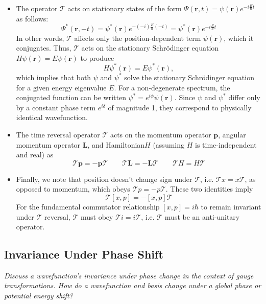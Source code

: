 \documentclass[11pt, a4paper]{article}
\newcommand{\Schro}{Schr\"{o}dinger\xspace}
\newcommand{\Ham}{Hamiltonian\xspace}
\renewcommand{\vec}[1]{\bm{#1}}  %
\renewcommand{\r}{\vec{r}}  %
\newcommand{\T}{\mathcal{T}}  %
\newcommand{\p}{\psi}  %
\renewcommand{\P}{\Psi}  %
\begin{document}
\begin{itemize}
	\item The operator $ \T $ acts on stationary states of the form $ \P(\r, t) = \p(\r)e^{-i\frac{E}{\hbar}t} $ as follows:
	\begin{equation*}
		\P^{*}(\r, -t) = \p^{*}(\r)e^{-(-i)\frac{E}{\hbar}(-t)} = \p^{*}(\r)e^{-i\frac{E}{\hbar}t}
	\end{equation*}
	In other words, $ \T $ affects only the position-dependent term $ \p(\r) $, which it conjugates. Thus, $ \T $ acts on the stationary \Schro equation $ H \p(\r) = E\p(\r) $ to produce
	\begin{equation*}
		 H \p^{*}(\r) = E\p^{*}(\r),
	\end{equation*}
	which implies that both $ \p $ and $ \p^{*} $ solve the stationary \Schro equation for a given energy eigenvalue $ E $. For a non-degenerate spectrum, the conjugated function can be written $ \p^{*} = e^{i\phi}\p(\r) $. Since $ \p $ and $ \p^{*} $ differ only by a constant phase term $ e^{i\delta} $ of magnitude 1, they correspond to physically identical wavefunction.
	
	\item The time reversal operator $ \T $ acts on the momentum operator $ \vec{p} $, angular momentum operator $ \vec{L} $, and \Ham $ H $ (assuming $ H $ is time-independent and real) as
	\begin{equation*}
		\T \vec{p} = - \vec{p} \T \qquad \T \vec{L} = - \vec{L} \T \qquad \T H = H \T
	\end{equation*}
	
	\item Finally, we note that position doesn't change sign under $ \T $, i.e. $ \T x = x \T $, as opposed to momentum, which obeys $ \T p = - p \T $. These two identities imply
	\begin{equation*}
		\T[x, p] = - [x, p]\T
	\end{equation*}
	For the fundamental commutator relationship $ [x, p] = i\hbar $ to remain invariant under $ \T $ reversal, $ \T $ must obey $ \T i = i \T $, i.e. $ \T $ must be an anti-unitary operator.

\end{itemize}


\subsection{Invariance Under Phase Shift}
\textit{Discuss a wavefunction's invariance under phase change in the context of gauge transformations. How do a wavefunction and basis change under a global phase or potential energy shift?}
\end{document}
